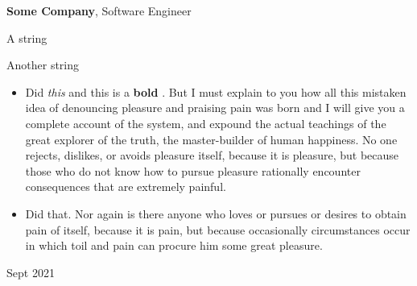 \documentclass[10pt, letterpaper]{article}
\newenvironment{summary}{
    \begin{description}[
        topsep=0.10 cm,
        parsep=0.10 cm,
        partopsep=0pt,
        itemsep=0pt,
        leftmargin=0.4 cm + 10pt
    ]
}{
    \end{description}
} %
\newenvironment{highlights}{
    \begin{itemize}[
        topsep=0.10 cm,
        parsep=0.10 cm,
        partopsep=0pt,
        itemsep=0pt,
        leftmargin=0.4 cm + 10pt
    ]
}{
    \end{itemize}
} %
\newenvironment{twocolentry}[2][]{
    \onecolentry
    \def\secondColumn{#2}
    \setcolumnwidth{\fill, 4.5 cm}
    \begin{paracol}{2}
}{
    \switchcolumn \raggedleft \secondColumn
    \end{paracol}
    \endonecolentry
} %
\let\hrefWithoutArrow\href
\renewcommand{\href}[2]{\hrefWithoutArrow{#1}{\ifthenelse{\equal{#2}{}}{ }{#2 }\raisebox{.15ex}{\footnotesize \faExternalLink*}}}
\begin{document}
        \vspace{0.2 cm}

        \begin{twocolentry}{
            Sept 2021
        }
            \textbf{Some \textnormal{Company}}, Software Engineer
            \begin{summary}
                \item A string
                \item Another string
            \end{summary}
            \begin{highlights}
                \item Did \textit{this} and this is a \textbf{bold} \href{https://example.com}{link}. But I must explain to you how all this mistaken idea of denouncing pleasure and praising pain was born and I will give you a complete account of the system, and expound the actual teachings of the great explorer of the truth, the master-builder of human happiness. No one rejects, dislikes, or avoids pleasure itself, because it is pleasure, but because those who do not know how to pursue pleasure rationally encounter consequences that are extremely painful.
                \item Did that. Nor again is there anyone who loves or pursues or desires to obtain pain of itself, because it is pain, but because occasionally circumstances occur in which toil and pain can procure him some great pleasure.
            \end{highlights}
        \end{twocolentry}


        \vspace{0.2 cm}
\end{document}
